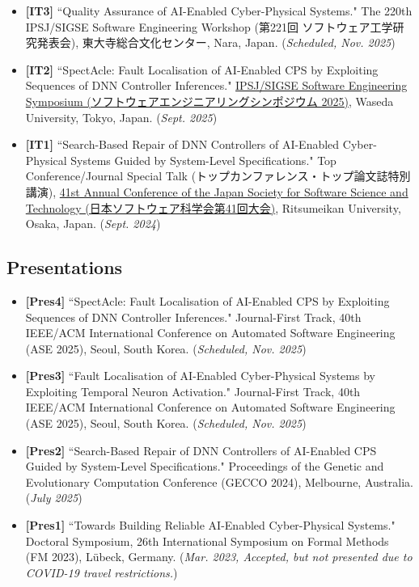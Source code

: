 \documentclass[11pt,a4paper]{moderncv}        %
\begin{document}
\begin{itemize}
    \item \textbf{[IT3]} ``Quality Assurance of AI-Enabled Cyber-Physical Systems." The 220th IPSJ/SIGSE Software Engineering Workshop (第221回 ソフトウェア工学研究発表会), 東大寺総合文化センター, Nara, Japan. (\textit{Scheduled, Nov. 2025})
    \item \textbf{[IT2]} ``SpectAcle: Fault Localisation of AI-Enabled CPS by Exploiting Sequences of DNN Controller Inferences." \href{https://ses.sigse.jp/2025/program.html}{IPSJ/SIGSE Software Engineering Symposium (ソフトウェアエンジニアリングシンポジウム 2025)}, Waseda University, Tokyo, Japan. (\textit{Sept. 2025})
    \item \textbf{[IT1]} ``Search-Based Repair of DNN Controllers of AI-Enabled Cyber-Physical Systems Guided by System-Level Specifications." Top Conference/Journal Special Talk (トップカンファレンス・トップ論文誌特別講演), \href{https://jssst2024.wordpress.com/program/}{41st Annual Conference of the Japan Society for Software Science and Technology (日本ソフトウェア科学会第41回大会)}, Ritsumeikan University, Osaka, Japan. (\textit{Sept. 2024})
\end{itemize}

\subsection{Presentations}

\begin{itemize}
    \item \textbf{[Pres4]} ``SpectAcle: Fault Localisation of AI-Enabled CPS by Exploiting Sequences of DNN Controller Inferences." Journal-First Track, 40th IEEE/ACM International Conference on Automated Software Engineering (ASE 2025), Seoul, South Korea. (\textit{Scheduled, Nov. 2025})
    \item \textbf{[Pres3]} ``Fault Localisation of AI-Enabled Cyber-Physical Systems by Exploiting Temporal Neuron Activation." Journal-First Track, 40th IEEE/ACM International Conference on Automated Software Engineering (ASE 2025), Seoul, South Korea. (\textit{Scheduled, Nov. 2025})
    \item \textbf{[Pres2]} ``Search-Based Repair of DNN Controllers of AI-Enabled CPS Guided by System-Level Specifications." Proceedings of the Genetic and Evolutionary Computation Conference (GECCO 2024), Melbourne, Australia. (\textit{July 2025})
    \item \textbf{[Pres1]} ``Towards Building Reliable AI-Enabled Cyber-Physical Systems." Doctoral Symposium, 26th International Symposium on Formal Methods (FM 2023), Lübeck, Germany. (\textit{Mar. 2023, Accepted, but not presented due to COVID-19 travel restrictions.})
\end{itemize}
\end{document}
